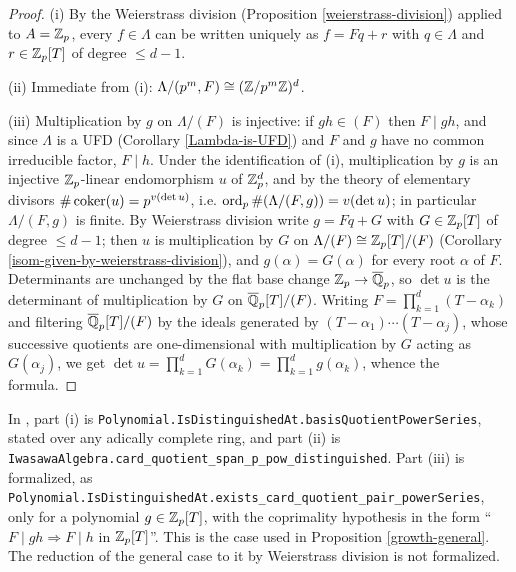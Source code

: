 \begin{proof}
(i) By the Weierstrass division (Proposition \ref{weierstrass-division}) applied
to $A={\mathbb {Z}}_p$, every $f\in\Lambda$ can be written uniquely as $f=Fq+r$ with
$q\in\Lambda$ and $r\in{\mathbb {Z}}_p[T]$ of degree $\leq d-1$.

(ii) Immediate from (i): $\Lambda/(p^m,F)\cong({\mathbb {Z}}/p^m{\mathbb {Z}})^d$.

(iii) Multiplication by $g$ on $\Lambda/(F)$ is injective: if $gh\in(F)$ then
$F\mid gh$, and since $\Lambda$ is a UFD (Corollary \ref{Lambda-is-UFD}) and $F$
and $g$ have no common irreducible factor, $F\mid h$.
Under the identification of (i), multiplication by $g$ is an injective
${\mathbb {Z}}_p$-linear endomorphism $u$ of ${\mathbb {Z}}_p^d$, and by the theory of elementary
divisors $\#\operatorname{coker}(u)=p^{v(\det u)}$, i.e.
$\operatorname{ord}_p\#(\Lambda/(F,g))=v(\det u)$; in particular $\Lambda/(F,g)$ is finite.
By Weierstrass division write $g=Fq+G$ with $G\in{\mathbb {Z}}_p[T]$ of degree $\leq d-1$;
then $u$ is multiplication by $G$ on
$\Lambda/(F)\cong{\mathbb {Z}}_p[T]/(F)$ (Corollary \ref{isom-given-by-weierstrass-division}),
and $g(\alpha)=G(\alpha)$ for every root $\alpha$ of $F$.
Determinants are unchanged by the flat base change
${\mathbb {Z}}_p\to\overline{{\mathbb {Q}}}_p$, so $\det u$ is the determinant of multiplication by $G$ on
$\overline{{\mathbb {Q}}}_p[T]/(F)$. Writing $F=\prod_{k=1}^d(T-\alpha_k)$ and filtering
$\overline{{\mathbb {Q}}}_p[T]/(F)$ by the ideals generated by
$(T-\alpha_1)\cdots(T-\alpha_j)$, whose successive quotients are
one-dimensional with multiplication by $G$ acting as $G(\alpha_j)$, we get
$\det u=\prod_{k=1}^dG(\alpha_k)=\prod_{k=1}^dg(\alpha_k)$, whence the formula.
\end{proof}

\begin{remark}
In {\Lean}, part (i) is
\texttt{Polynomial.IsDistinguishedAt.basisQuotientPowerSeries}, stated over any
adically complete ring, and part (ii) is
\texttt{IwasawaAlgebra.card\_quotient\_span\_p\_pow\_distinguished}. Part (iii)
is formalized, as
\texttt{Polynomial.IsDistinguishedAt.exists\_card\_quotient\_pair\_powerSeries},
only for a polynomial $g\in{\mathbb {Z}}_p[T]$, with the coprimality hypothesis in the
form ``$F\mid gh\Rightarrow F\mid h$ in ${\mathbb {Z}}_p[T]$''. This is the case used in
Proposition \ref{growth-general}. The reduction of the general case to it by
Weierstrass division is not formalized.
\end{remark}

